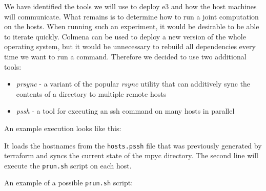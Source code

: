 We have identified the tools we will use to deploy \gls{e3} and how the
host machines will communicate. What remains is to determine how to run
a joint computation on the hosts. When running such an experiment, it
would be desirable to be able to iterate quickly. Colmena can be used to
deploy a new version of the whole operating system, but it would be
unnecessary to rebuild all dependencies every time we want to run a
command. Therefore we decided to use two additional tools:

\begin{itemize}
\tightlist
\item
  \emph{prsync} - a variant of the popular \emph{rsync} utility that can
  additively sync the contents of a directory to multiple remote hosts
\item
  \emph{pssh} - a tool for executing an ssh command on many hosts in
  parallel
\end{itemize}

An example execution looks like this:

\begin{Shaded}
\begin{Highlighting}[]
  
   
\end{Highlighting}
\end{Shaded}

It loads the hostnames from the \texttt{hosts.pssh} file that was
previously generated by terraform and syncs the current state of the
mpyc directory. The second line will execute the \texttt{prun.sh} script
on each host.

An example of a possible \texttt{prun.sh} script:

\newpage

